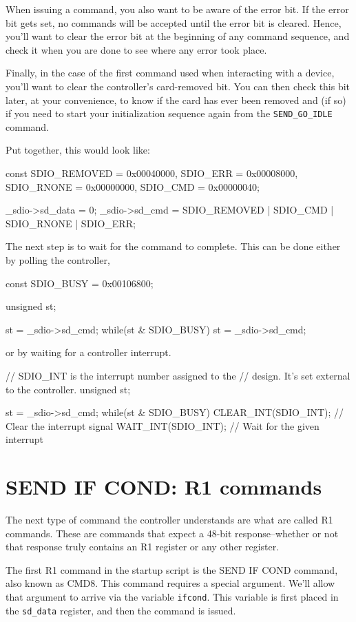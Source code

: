 \documentclass{gqtekspec}
\begin{document}
When issuing a command, you also want to be aware of the error bit.  If the
error bit gets set, no commands will be accepted until the error bit is cleared.
Hence, you'll want to clear the error bit at the beginning of any command
sequence, and check it when you are done to see where any error took place.

Finally, in the case of the first command used when interacting with a device,
you'll want to clear the controller's card-removed bit.  You can then check
this bit later, at your convenience, to know if the card has ever been removed
and (if so) if you need to start your initialization sequence again from
the {\tt SEND\_GO\_IDLE} command.

Put together, this would look like:
\begin{zCpp}
	const	SDIO_REMOVED = 0x00040000,
		SDIO_ERR     = 0x00008000,
		SDIO_RNONE   = 0x00000000,
		SDIO_CMD     = 0x00000040;

	_sdio->sd_data = 0;
	_sdio->sd_cmd  = SDIO_REMOVED | SDIO_CMD | SDIO_RNONE | SDIO_ERR;
\end{zCpp}

The next step is to wait for the command to complete.  This can be done either
by polling the controller,
\begin{zCpp}
	const	SDIO_BUSY    = 0x00106800;

	unsigned	st;

	st = _sdio->sd_cmd;
	while(st & SDIO_BUSY)
		st = _sdio->sd_cmd;
\end{zCpp}
or by waiting for a controller interrupt.
\begin{zCpp}
	// SDIO_INT is the interrupt number assigned to the
	// design.  It's set external to the controller.
	unsigned	st;

	st = _sdio->sd_cmd;
	while(st & SDIO_BUSY) {
		CLEAR_INT(SDIO_INT);	// Clear the interrupt signal
		WAIT_INT(SDIO_INT);	// Wait for the given interrupt
	}
\end{zCpp}

\section{SEND IF COND: R1 commands}
The next type of command the controller understands are what are called
R1 commands.  These are commands that expect a 48-bit response--whether
or not that response truly contains an R1 register or any other register.

The first R1 command in the startup script is the SEND IF COND command, also
known as CMD8.  This command requires a special argument.  We'll allow that
argument to arrive via the variable {\tt ifcond}.  This variable is first
placed in the {\tt sd\_data} register, and then the command is issued.
\end{document}
